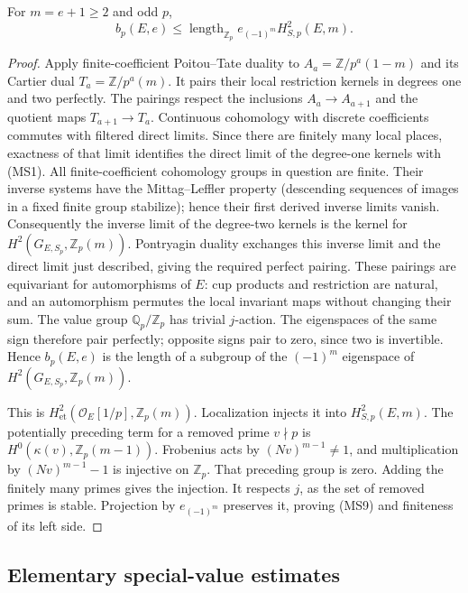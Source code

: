 \begin{lemma}\label{ms-localization}
For $m=e+1\ge2$ and odd $p$,
\[
 b_p(E,e)\le
 \operatorname{length}_{\mathbb Z_p}
                       e_{(-1)^m}H^2_{S,p}(E,m).
 \tag{MS9}
\]
\end{lemma}
\begin{proof}
Apply finite-coefficient Poitou--Tate duality
\cite[Chapter I, Theorem 4.10(a)]{milne-adt}
to $A_a=\mathbb Z/p^a(1-m)$ and its Cartier dual
$T_a=\mathbb Z/p^a(m)$.  It pairs their local restriction
kernels in degrees one and two perfectly.
The pairings respect the inclusions $A_a\longrightarrow A_{a+1}$
and the quotient maps $T_{a+1}\longrightarrow T_a$.
Continuous cohomology with discrete coefficients commutes
with filtered direct limits.  Since there are finitely many
local places, exactness of that limit identifies the direct
limit of the degree-one kernels with (MS1).
All finite-coefficient cohomology groups in question are
finite.  Their inverse systems have the Mittag--Leffler
property (descending sequences of images in a fixed finite
group stabilize); hence their first derived inverse limits
vanish.  Consequently the inverse limit of the degree-two
kernels is the kernel for
$H^2(G_{E,S_p},\mathbb Z_p(m))$.
Pontryagin duality exchanges this inverse limit and the
direct limit just described, giving the required perfect
pairing.  These pairings are equivariant for automorphisms of $E$:
cup products and restriction are natural, and an automorphism
permutes the local invariant maps without changing their sum.
The value group $\mathbb Q_p/\mathbb Z_p$ has trivial
$j$-action.  The eigenspaces of the same sign therefore
pair perfectly; opposite signs pair to zero, since two
is invertible.  Hence $b_p(E,e)$ is the length of a subgroup
of the $(-1)^m$ eigenspace of
$H^2(G_{E,S_p},\mathbb Z_p(m))$.

This is
$H^2_{\mathrm{et}}(\mathcal O_E[1/p],\mathbb Z_p(m))$.
Localization injects it into $H^2_{S,p}(E,m)$.
The potentially preceding term for a removed prime
$v\nmid p$ is
$H^0(\kappa(v),\mathbb Z_p(m-1))$.
Frobenius acts by $(Nv)^{m-1}\ne1$, and multiplication
by $(Nv)^{m-1}-1$ is injective on $\mathbb Z_p$.
That preceding group is zero.
Adding the finitely many primes gives the injection.
It respects $j$, as the set of removed primes is stable.
Projection by $e_{(-1)^m}$ preserves it, proving (MS9)
and finiteness of its left side.
\end{proof}

\subsection{Elementary special-value estimates}

